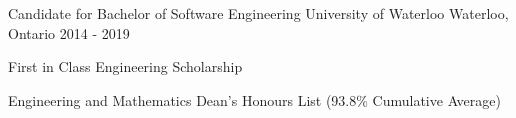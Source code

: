 \begin{cventries}
  \cventry
    {Candidate for Bachelor of Software Engineering}
    {University of Waterloo}
    {Waterloo, Ontario}
    {2014 - 2019}
    {
      \begin{cvitems}
      \item First in Class Engineering Scholarship
      \item Engineering and Mathematics Dean’s Honours List (93.8\% Cumulative Average)
      \end{cvitems}
    }
\end{cventries}
